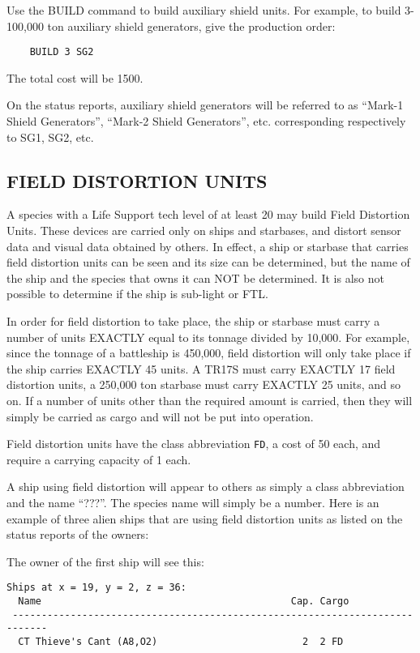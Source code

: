 \documentclass[10pt,titlepage]{article}
\begin{document}
Use the BUILD command to build auxiliary shield units.  For example, to build
3-100,000 ton auxiliary shield generators, give the production order:

\begin{verbatim}
	BUILD 3 SG2\end{verbatim} 

\noindent The total cost will be 1500.

\noindent On the status reports, auxiliary shield generators will be referred to as
``Mark-1 Shield Generators'', ``Mark-2 Shield Generators'', etc. corresponding
respectively to SG1, SG2, etc.


\subsection{FIELD DISTORTION UNITS}

A species with a Life Support tech level of at least 20 may build Field
Distortion Units.  These devices are carried only on ships and starbases, and
distort sensor data and visual data obtained by others.  In effect, a ship or
starbase that carries field distortion units can be seen and its size can be
determined, but the name of the ship and the species that owns it can NOT be
determined.  It is also not possible to determine if the ship is sub-light or
FTL.

In order for field distortion to take place, the ship or starbase must carry a
number of units EXACTLY equal to its tonnage divided by 10,000.  For example,
since the tonnage of a battleship is 450,000, field distortion will only take
place if the ship carries EXACTLY 45 units.  A TR17S must carry EXACTLY 17
field distortion units, a 250,000 ton starbase must carry EXACTLY 25 units,
and so on.  If a number of units other than the required amount is carried,
then they will simply be carried as cargo and will not be put into operation.

Field distortion units have the class abbreviation \texttt{FD}, a cost of 50 each,
and require a carrying capacity of 1 each.

A ship using field distortion will appear to others as simply a class
abbreviation and the name ``???''.  The species name will simply be a number. 
Here is an example of three alien ships that are using field distortion units
as listed on the status reports of the owners:


The owner of the first ship will see this:

\begin{verbatim}
Ships at x = 19, y = 2, z = 36:
  Name                                           Cap. Cargo
 ----------------------------------------------------------------------------
  CT Thieve's Cant (A8,O2)                         2  2 FD\end{verbatim} 
\end{document}

